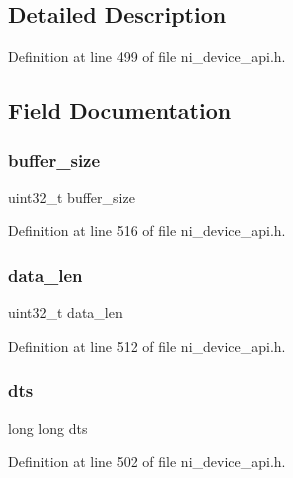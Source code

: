 \subsection{Detailed Description}


Definition at line 499 of file ni\+\_\+device\+\_\+api.\+h.



\subsection{Field Documentation}
\mbox{\label{struct__ni__packet_ab4bab919e0d995ad7249474cd9028105}} 
\subsubsection{\texorpdfstring{buffer\_size}{buffer\_size}}
{\footnotesize\ttfamily uint32\+\_\+t buffer\+\_\+size}



Definition at line 516 of file ni\+\_\+device\+\_\+api.\+h.

\mbox{\label{struct__ni__packet_a231d88a2076c53df88d8ffd7eb1c50ec}} 
\subsubsection{\texorpdfstring{data\_len}{data\_len}}
{\footnotesize\ttfamily uint32\+\_\+t data\+\_\+len}



Definition at line 512 of file ni\+\_\+device\+\_\+api.\+h.

\mbox{\label{struct__ni__packet_a5b339e32ee63aeb67076062ba959ca51}} 
\subsubsection{\texorpdfstring{dts}{dts}}
{\footnotesize\ttfamily long long dts}



Definition at line 502 of file ni\+\_\+device\+\_\+api.\+h.

